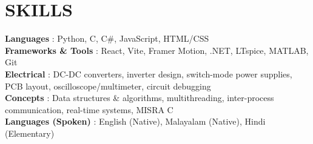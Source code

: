 \documentclass[letterpaper,11pt]{article}
\begin{document}
\section{SKILLS}
 \begin{itemize}[leftmargin=0in, label={}]
    \small{\item{
     \textbf{Languages} {: Python, C, C\#, JavaScript, HTML/CSS} \vspace{2pt} \\
     \textbf{Frameworks \& Tools} {: React, Vite, Framer Motion, .NET, LTspice, MATLAB, Git} \vspace{2pt} \\
     \textbf{Electrical} {: DC-DC converters, inverter design, switch-mode power supplies, PCB layout, oscilloscope/multimeter, circuit debugging} \vspace{2pt} \\
     \textbf{Concepts} {: Data structures \& algorithms, multithreading, inter-process communication, real-time systems, MISRA C} \vspace{2pt} \\
     \textbf{Languages (Spoken)} {: English (Native), Malayalam (Native), Hindi (Elementary)}
    }}
 \end{itemize}

\end{document}
